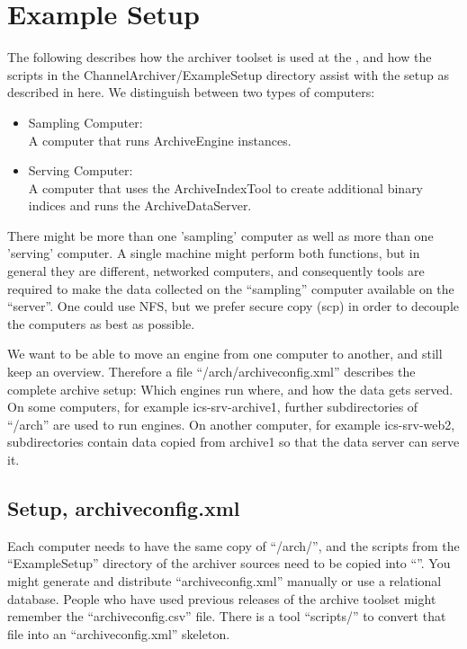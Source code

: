 \chapter{Example Setup} \label{ch:examplesetup}
The following describes how the archiver toolset is used at the
, and how the scripts in
the ChannelArchiver/ExampleSetup directory assist with the
setup as described in here.
We distinguish between two types of computers:
\begin{itemize}
\item Sampling Computer:\\
      A computer that runs ArchiveEngine instances.
\item Serving Computer:\\
      A computer that uses the ArchiveIndexTool to create
      additional binary indices and runs the ArchiveDataServer.
\end{itemize}

\noindent There might be more than one 'sampling' computer as well as more
than one 'serving' computer.  A single machine might perform both
functions, but in general they are different, networked computers, and
consequently tools are required to make the data collected on the
``sampling'' computer available on the ``server''.  One could use NFS,
but we prefer secure copy (scp) in order to decouple the computers as
best as possible.

We want to be able to move an engine from one computer to another, and
still keep an overview.  Therefore a file ``/arch/archiveconfig.xml''
describes the complete archive setup: Which engines run where, and how
the data gets served.  On some computers, for example
ics-srv-archive1, further subdirectories of ``/arch'' are used to run
engines.  On another computer, for example ics-srv-web2,
subdirectories contain data copied from archive1 so that the data
server can serve it.

\section{Setup, archiveconfig.xml}
Each computer needs to have the same copy of ``/arch/'',
and the scripts from the ``ExampleSetup'' directory of the archiver
sources need to be copied into ``''.
You might generate and distribute ``archiveconfig.xml'' manually or use a
relational database.  People who have used previous releases of the
archive toolset might remember the ``archiveconfig.csv'' file. There is a
tool ``scripts/'' to convert that
file into an ``archiveconfig.xml'' skeleton.

